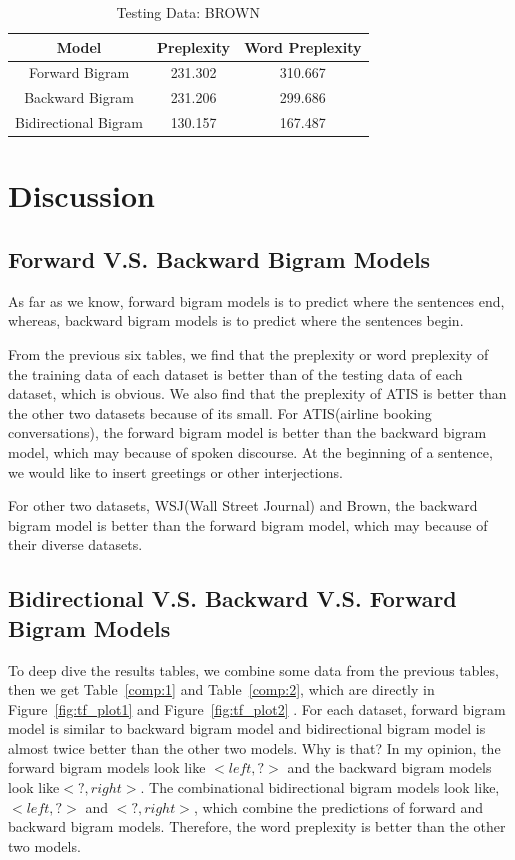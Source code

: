 \documentclass[journal, a4paper]{IEEEtran}
\begin{document}
	\begin{table}[!hbt]
		\begin{center}
		\caption{Testing Data: BROWN}
		\label{tab:6}
		\begin{tabular}{|c|c|c|}
			\hline
			Model & Preplexity & Word Preplexity\\
			\hline
			 Forward Bigram & 231.302  & 310.667 \\ \hline
			 Backward Bigram  & 231.206 &  299.686 \\ \hline
			Bidirectional Bigram & 130.157 & 167.487 \\
			\hline
		\end{tabular}
		\end{center}
	\end{table}


\section{Discussion}\label{discuss}
\subsection{Forward V.S. Backward Bigram Models}
As far as we know, forward bigram models is to predict where the sentences end, whereas, backward bigram models is to predict where the sentences begin.

From the previous six tables, we find that the preplexity or word preplexity of the training data of each dataset is better than of the testing data of each dataset, which is obvious. We also find that the preplexity of ATIS is better than the other two datasets because of its small. For ATIS(airline booking conversations), the forward bigram model is better than the backward bigram model, which may because of spoken discourse. At the beginning of a sentence, we would like to insert greetings or other interjections.

For other two datasets, WSJ(Wall Street Journal) and Brown, the backward bigram model is better than the forward bigram model, which may because of their diverse datasets.

\subsection{Bidirectional V.S. Backward V.S. Forward Bigram Models}
To deep dive the results tables, we combine some data from the previous tables, then we get Table~\ref{comp:1} and Table~\ref{comp:2}, which are directly in Figure~\ref{fig:tf_plot1} and Figure~\ref{fig:tf_plot2} . For each dataset, forward bigram model is similar to backward bigram model and bidirectional bigram model is almost twice better than the other two models. Why is that? In my opinion, the forward bigram models look like $<left, ?>$ and  the backward bigram models look like$ <?, right>$. The combinational bidirectional bigram models look like, $<left, ?>$ and $<?, right>$, which combine the predictions of forward and backward bigram models. Therefore, the word preplexity is better than the other two models.
	
\end{document}
